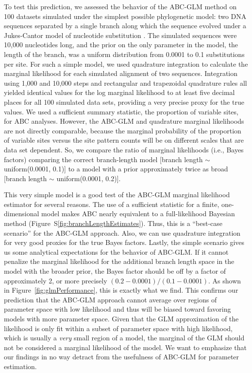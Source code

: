 To test this prediction, we assessed the behavior of the ABC-GLM method on
100 datasets simulated under the simplest possible phylogenetic model: two DNA
sequences separated by a single branch along which the sequence evolved under a
Jukes-Cantor model of nucleotide substitution \citep{JC1969}.
The simulated sequences were 10,000 nucleotides long, and the prior on the only
parameter in the model, the length of the branch, was a uniform distribution
from 0.0001 to 0.1 substitutions per site.
For such a simple model, we used quadrature integration to calculate the
marginal likelihood for each simulated alignment of two sequences.
Integration using 1,000 and 10,000 steps and rectangular and trapezoidal
quadrature rules all yielded identical values for the log marginal likelihood
to at least five decimal places for all 100 simulated data sets, providing a
very precise proxy for the true values.
We used a sufficient summary statistic, the proportion of variable sites, for
ABC analyses.
However, the ABC-GLM and quadrature marginal likelihoods are not directly
comparable, because the marginal probability of the proportion of variable
sites versus the site pattern counts will be on different scales that are data
set dependent.
So, we compare the ratio of marginal likelihoods (i.e., Bayes factors)
comparing the correct branch-length model
[branch length $\sim$ uniform(0.0001, 0.1)]
to a model with a prior approximately twice as broad
[branch length $\sim$ uniform(0.0001, 0.2)].

This very simple model is a good test of the ABC-GLM marginal likelihood
estimator for several reasons.
The use of a sufficient statistic for a finite, one-dimensional model makes ABC
nearly equivalent to a full-likelihood Bayesian method
(Figure~S\ref{fig:branchLengthEstimates}).
Thus, this is a ``best-case scenario'' for the ABC-GLM approach.
Also, we can use quadrature integration for very good proxies for the true
Bayes factors.
Lastly, the simple scenario gives us some analytical expectations for the
behavior of ABC-GLM.
If it cannot penalize the marginal likelihood for the additional branch length
space in the model with the broader prior, the Bayes factor should be off by a
factor of approximately 2, or more precisely $(0.2-0.0001) / (0.1-0.0001)$.
As shown in Figure~\ref{fig:glmPerformance}, this is exactly what we find.
This confirms our prediction that the ABC-GLM approach cannot average over
regions of parameter space with low likelihood and thus will be biased toward
favoring models with more parameter space.
Given that the GLM approximation of the likelihood is only fit within a subset
of parameter space with high likelihood, which is usually a \emph{very} small
region of a model, the marginal of the GLM should not be considered a marginal
likelihood of the model.
We want to emphasize that our findings in no way detract from the usefulness of
ABC-GLM for parameter estimation.


